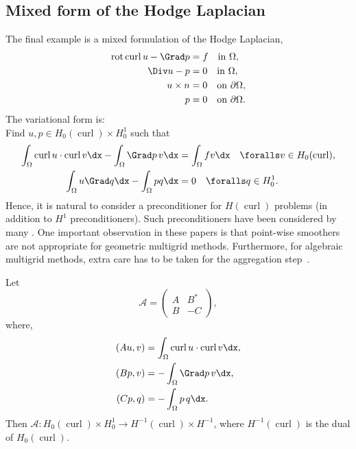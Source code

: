\subsection{Mixed form of the Hodge Laplacian}
The final example is a mixed formulation
of the Hodge Laplacian,
\begin{align}
\mop{rot} \mop{curl} u - \Grad p &= f \quad \mbox{in} \ \Omega,    \label{mixed:hodge1} \\
\Div u -p &=  0 \quad \mbox{in} \ \Omega, \label{mixed:hodge2} \\
             u \times n &= 0 \quad \mbox{on} \ \partial \Omega, \\
             p          &= 0 \quad \mbox{on} \ \partial \Omega.
\end{align}
The variational form is: \\
Find $u, p \in H_0(\operatorname{curl}) \times H^1_0$ such that
\begin{align}
\int_\Omega \mop{curl} u \cdot \mop{curl} v \dx
- \int_\Omega \Grad p \, v \dx &= \int_\Omega f v \dx  \quad \foralls v \in H_0(\operatorname{curl}), \\
 \int_\Omega u  \Grad q \dx - \int_\Omega p q \dx &= 0 \quad
 \foralls q \in H^1_0.
\end{align}
Hence, it is natural to consider a preconditioner  for
$H(\operatorname{curl})$ problems (in addition to $H^1$
preconditioners). Such preconditioners have been considered by many
\citep{ArnoldFalkWinther1997a,ArnoldFalkWinther2000,Hiptmair1997,Hiptmair1999}.
One important observation in these papers is that point-wise smoothers
are not appropriate for geometric multigrid methods. Furthermore, for
algebraic multigrid methods, extra care has to be taken for the
aggregation
step~\citep{GeeSiefertHuEtAl2006,HuTuminaroBochevEtAl2006}.

Let
\[
\mathcal{A}  =
\begin{pmatrix} A & B^* \\ B & -C \end{pmatrix},
\]
where,
\begin{align}
  (A u, v) &= \int_\Omega \mop{curl} u \cdot \mop{curl} v \dx, \\
  (B p, v) &=  - \int_\Omega \Grad p \, v \dx, \\
  (C p, q) &=  - \int_\Omega p \, q \dx.
\end{align}
Then $\mathcal{A}: H_0(\operatorname{curl}) \times H^1_0 \rightarrow
H^{-1}(\operatorname{curl}) \times H^{-1}$, where
$H^{-1}(\operatorname{curl})$ is the dual of
$H_0(\operatorname{curl})$.

